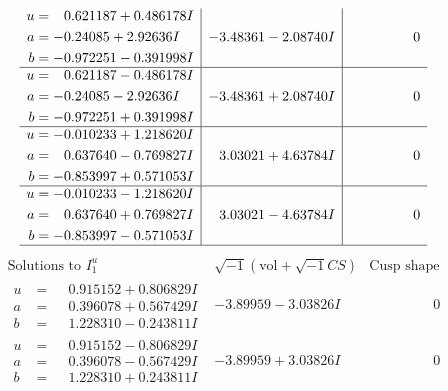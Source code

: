 \documentclass[1p]{elsarticle_modified}
\theoremstyle{definition}
\newcommand{\I}{\sqrt{-1}}
\begin{document}
$$\begin{array}{c|c|c}
\begin{aligned}
u &= \phantom{-}0.621187 + 0.486178 I \\
a &= -0.24085 + 2.92636 I \\
b &= -0.972251 - 0.391998 I\end{aligned}
 & -3.48361 - 2.08740 I & \phantom{-0.000000 } 0 \\ \hline\begin{aligned}
u &= \phantom{-}0.621187 - 0.486178 I \\
a &= -0.24085 - 2.92636 I \\
b &= -0.972251 + 0.391998 I\end{aligned}
 & -3.48361 + 2.08740 I & \phantom{-0.000000 } 0 \\ \hline\begin{aligned}
u &= -0.010233 + 1.218620 I \\
a &= \phantom{-}0.637640 - 0.769827 I \\
b &= -0.853997 + 0.571053 I\end{aligned}
 & \phantom{-}3.03021 + 4.63784 I & \phantom{-0.000000 } 0 \\ \hline\begin{aligned}
u &= -0.010233 - 1.218620 I \\
a &= \phantom{-}0.637640 + 0.769827 I \\
b &= -0.853997 - 0.571053 I\end{aligned}
 & \phantom{-}3.03021 - 4.63784 I & \phantom{-0.000000 } 0\\
 \hline 
 \end{array}$$\newpage$$\begin{array}{c|c|c}  
\text{Solutions to }I^u_{1}& \I (\text{vol} + \sqrt{-1}CS) & \text{Cusp shape}\\
 \hline 
\begin{aligned}
u &= \phantom{-}0.915152 + 0.806829 I \\
a &= \phantom{-}0.396078 + 0.567429 I \\
b &= \phantom{-}1.228310 - 0.243811 I\end{aligned}
 & -3.89959 - 3.03826 I & \phantom{-0.000000 } 0 \\ \hline\begin{aligned}
u &= \phantom{-}0.915152 - 0.806829 I \\
a &= \phantom{-}0.396078 - 0.567429 I \\
b &= \phantom{-}1.228310 + 0.243811 I\end{aligned}
 & -3.89959 + 3.03826 I & \phantom{-0.000000 } 0 \\ \hline\begin{aligned}

\end{aligned}
\end{array}$$
\end{document}

